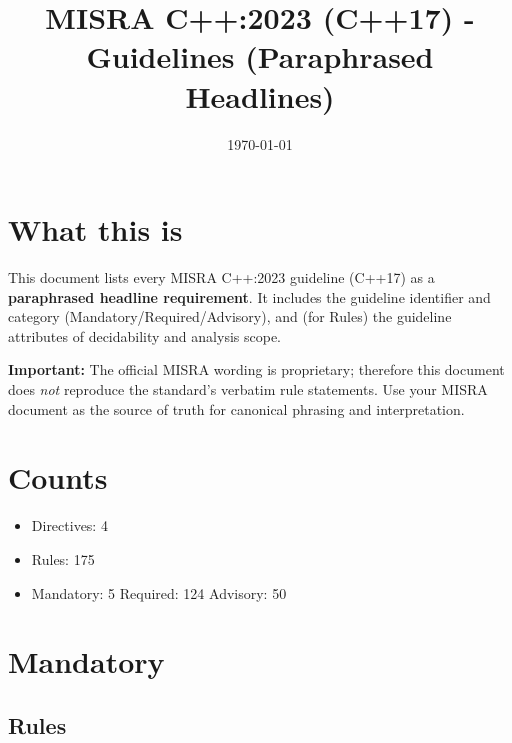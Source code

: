 \documentclass[11pt]{article}
\title{MISRA C++:2023 (C++17) - Guidelines (Paraphrased Headlines)}
\author{}
\date{\today}
\begin{document}
\maketitle

\raggedright

\section*{What this is}
This document lists every MISRA C++:2023 guideline (C++17) as a \textbf{paraphrased headline requirement}.
It includes the guideline identifier and category (Mandatory/Required/Advisory), and (for Rules) the guideline attributes of decidability and analysis scope.

\textbf{Important:} The official MISRA wording is proprietary; therefore this document does \emph{not} reproduce the standard's verbatim rule statements.
Use your MISRA document as the source of truth for canonical phrasing and interpretation.

\section*{Counts}
\begin{itemize}
  \item Directives: 4
  \item Rules: 175
  \item Mandatory: 5 \quad Required: 124 \quad Advisory: 50
\end{itemize}

\section{Mandatory}

\subsection{Rules}
\end{document}
